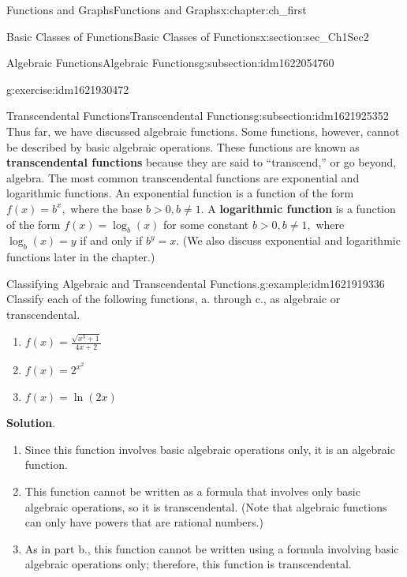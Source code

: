 \documentclass[oneside,10pt,]{book}
\newcommand{\blocktitlefont}{\relax}
\newcommand{\terminology}[1]{\textbf{#1}}
\numberwithin{equation}{section}
\newcommand{\gt}{>}
\begin{document}
\begin{chapterptx}{Functions and Graphs}{}{Functions and Graphs}{}{}{x:chapter:ch_first}
\begin{sectionptx}{Basic Classes of Functions}{}{Basic Classes of Functions}{}{}{x:section:sec_Ch1Sec2}
\begin{subsectionptx}{Algebraic Functions}{}{Algebraic Functions}{}{}{g:subsection:idm1622054760}
\begin{inlineexercise}{}{g:exercise:idm1621930472}
\end{inlineexercise}%
\end{subsectionptx}
%
%
\typeout{************************************************}
\typeout{************************************************}
%
\begin{subsectionptx}{Transcendental Functions}{}{Transcendental Functions}{}{}{g:subsection:idm1621925352}
Thus far, we have discussed algebraic functions. Some functions, however, cannot be described by basic algebraic operations. These functions are known as \terminology{transcendental functions} because they are said to “transcend,” or go beyond, algebra. The most common transcendental functions are  exponential  and logarithmic functions. An exponential function is a function of the form \(f(x)=b^x,\) where the base \(b\gt  0 ,b\neq  1 .\) A \terminology{logarithmic function} is a function of the form \(f(x)=\log_b(x)\) for some constant \(b\gt  0 ,b\neq  1 ,\) where \(\log_b(x)=y\) if and only if \(b^y=x.\) (We also discuss exponential and logarithmic functions later in the chapter.)%
\begin{example}{Classifying Algebraic and Transcendental Functions.}{g:example:idm1621919336}%
Classify each of the following functions, a. through c., as algebraic or transcendental.%
%
\begin{enumerate}
\item{}\(\displaystyle f(x)=\frac{\sqrt{x^3 + 1 }}{ 4 x+ 2 }\)%
\item{}\(\displaystyle f(x)=2^{x^2}\)%
\item{}\(\displaystyle f(x)=\ln(2x) \)%
\end{enumerate}
\par\smallskip%
\noindent\textbf{\blocktitlefont Solution}.\hypertarget{g:solution:idm1621916776}{}\quad{}%
\begin{enumerate}
\item{}Since this function involves basic algebraic operations only, it is an algebraic function.%
\item{}This function cannot be written as a formula that involves only basic algebraic operations, so it is transcendental. (Note that algebraic functions can only have powers that are rational numbers.)%
\item{}As in part b., this function cannot be written using a formula involving basic algebraic operations only; therefore, this function is transcendental.%
\end{enumerate}
\end{example}

\end{subsectionptx}
\end{sectionptx}
\end{chapterptx}
\end{document}
